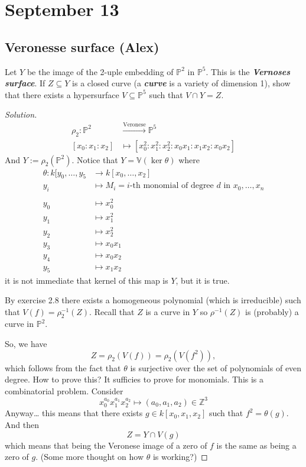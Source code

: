 \section{September 13}

\subsection{Veronesse surface (Alex)}

\begin{manualexercise}{2.13}
	Let $Y$ be the image of the 2-uple embedding of $\mathbb{P}^2$ in $\mathbb{P}^{5}$. This is the \textit{\textbf{Vernoses surface}}. If $Z\subseteq Y$ is a closed curve (a \textit{\textbf{curve}} is a variety of dimension 1), show that there exists a hypersurface $V\subseteq \mathbb{P}^5$ such that $V \cap Y=Z$.
\end{manualexercise}

\begin{proof}[Solution]\leavevmode
	\begin{align*}
		\rho_2: \mathbb{P}^2 &\overset{\text{Veronese} }{\longrightarrow}\mathbb{P}^5\\
		[x_0:x_1:x_2]&\longmapsto [x_0^2:x_1^2:x_2^2:x_0x_1:x_1x_2:x_0x_2]
	\end{align*}
	And $Y:=\rho_2(\mathbb{P}^2)$. Notice that $Y=\mathbb{V}(\ker \theta)$ where
	\begin{align*}
		\theta: k[y_0,\ldots,y_5 &\longrightarrow k[x_0,\ldots,x_2] \\
		y_i &\longmapsto M_i=\text{$i$-th monomial of degree $d$ in $x_0,\ldots,x_n$}\\ \\
		y_0&\longmapsto x_0^2\\
		y_1&\longmapsto x_1^2\\
		y_2&\longmapsto x_2^2\\
		y_3&\longmapsto x_0x_1\\
		y_4&\longmapsto x_0x_2\\
		y_5&\longmapsto x_1x_2
	\end{align*}
 it is not immediate that kernel of this map is $Y$, but it is true.

 By exercise 2.8 there exists a homogeneous polynomial (which is irreducible) such that $V(f)=\rho^{-1}_2(Z)$. Recall that $Z$ is a curve in $Y$ so $\rho^{-1}(Z)$ is (probably) a curve in $\mathbb{P}^2$.

 So, we have
 \[Z=\rho_2(V(f))=\rho_2(V(f^2)),\]
 which follows from the fact that $\theta$ is surjective over the set of polynomials of even degree. How to prove this? It sufficies to prove for monomials. This is a combinatorial problem. Consider
 \[x_0^{a_0}x_1^{a_1}x_2^{a_2}\longmapsto(a_0,a_1,a_2)\in\mathbb{Z}^3\]
 Anyway… this means that there exists $g\in k[x_0,x_1,x_2]$ such that $f^2=\theta(g)$. And then
 \[Z=Y\cap V(g)\]
 which means that being the Veronese image of a zero of $f$ is the same as being a zero of $g$. (Some more thought on how $\theta$ is working?)
\end{proof}

